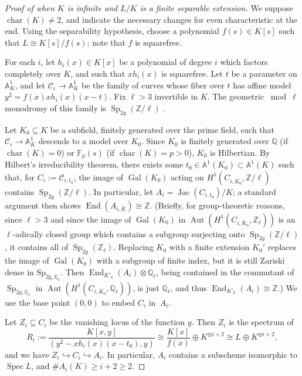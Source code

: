 \documentclass[11pt, reqno]{amsart}
\numberwithin{equation}{section}
\theoremstyle{definition}
\theoremstyle{remark}
\def\ff{{\mathbb F}}
\def\rat{{\mathbb Q}}
\def\integ{{\mathbb Z}}
\def\iso{\cong}
\renewcommand{\bar}[1]{{\overline{#1}}}
\DeclareMathOperator{\End}{End}
\DeclareMathOperator{\gal}{Gal}
\DeclareMathOperator{\spec}{Spec}
\begin{document}
         
\begin{proof}[Proof of  when $K$ is infinite and $L/K$ is a finite  \emph{separable} extension]

We suppose  
$\operatorname{char}(K)\not  = 2$, and indicate the
necessary changes for even characteristic at the end.  Using the
separability hypothesis, choose a
polynomial $f(s) \in K[s]$ such that $L \iso K[s]/f(s)$; note that $f$
is squarefree.


For each $i$, let $h_i(x) \in K[x]$ be a polynomial of degree $i$
which factors completely over $K$, and such that $x h_i(x)$ is
squarefree.
 Let $t$ be a parameter on $\mathbb A^1_K$, and let
$\mathcal C_i \to \mathbb A^1_K$ be the family of curves whose fiber over
$t$ has affine model $y^2 = f(x)x h_i(x)(x-t)$.  Fix $\ell > 3$
invertible in $K$.  The geometric $\bmod \ell$ monodromy of this family
is $\operatorname{Sp}_{2g}(\integ/\ell)$ \cite{hallbigmonodromy}.

Let $K_0 \subseteq K$ be a subfield, finitely generated over the prime
field, such that $\mathcal C_i \to \mathbb A^1_K$ descends to a model over
$K_0$. Since $K_0$ is finitely generated over $\rat$ (if
$\operatorname{char}(K)=0$) or $\ff_p(s)$ (if
$\operatorname{char}(K)=p>0$), $K_0$ is Hilbertian.  By Hilbert's
irreducibility theorem, there exists some $t_0 \in \mathbb A^1(K_0) \subset
\mathbb A^1(K)$ such that, for $C_i := \mathcal C_{i,t_0}$, the image of $\gal(K_0)$ acting on $H^1(C_{i, \bar K_0},\integ/\ell)$ contains $\operatorname{Sp}_{2g}(\integ/\ell)$.  In particular, let $A_i = \operatorname{Jac}(C_{i,t_0})/K$; a standard argument then shows $\End(A_{i,\bar K}) \iso \integ$.  (Briefly, for 
  group-theoretic reasons, since $\ell>3$ and since the image of
  $\gal(K_0)$ in $\operatorname{Aut}(H^1(C_{i,\bar K_0},\integ_\ell))$
  is an $\ell$-adically closed group which contains a subgroup surjecting onto
  $\operatorname{Sp}_{2g}(\integ/\ell)$, it contains all of
  $\operatorname{Sp}_{2g}(\integ_\ell)$.  Replacing $K_0$ with a
  finite extension $K_0'$ replaces the image of $\gal(K_0)$ with a
  subgroup of finite index, but it is still Zariski dense in
  $\operatorname{Sp_{2g,\rat_\ell}}$.  Then
  $\End_{K'_0}(A_i)\otimes\rat_\ell$, being contained in the commutant
  of $\operatorname{Sp}_{2g,\rat_\ell}$ in $\operatorname{Aut}(H^1(C_{i,\bar K_0},\rat_\ell))$, is just $\rat_\ell$, and thus
  $\End_{K'_0}(A_i) \iso \integ$.) 
 We use the base point $(0,0)$ to embed $C_i$ in~$A_i$.

Let $Z_i \subseteq C_i$ be the vanishing locus of the function $y$.  Then $Z_i$ is the spectrum of 
\[
R_i :=\frac{K[x,y]}{(y^2-xh_i(x)(x-t_0), y)} \iso \frac{K[x]}{f(x)} \oplus K^{\oplus i+2} \iso L\oplus K^{\oplus i+2},
\]
and we have $Z_i \hookrightarrow C_i \hookrightarrow A_i$.  In
particular, $A_i$ contains a subscheme isomorphic to $\spec L$, and
$\#A_i(K) \ge i+2 \ge 2$.


\end{proof}
\end{document}
